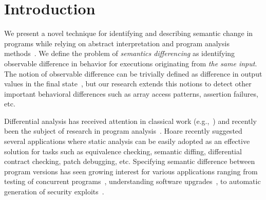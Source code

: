 \section{Introduction} 

We present a novel technique for identifying and describing semantic change in programs while relying on abstract interpretation and program analysis methods~\cite{CousotCousot77}. We define the problem of \emph{semantics differencing} as identifying observable difference in behavior for executions originating from \emph{the same input}. The notion of observable difference can be trivially defined as difference in output values in the final state~\cite{DwyerElbaumPerson08,GodlinStrichman09,EnglerRamos11,HawblitzelKawaguchiLahiriRebelo12}, but our research extends this notions to detect other important behavioral differences such as array access patterns, assertion failures, etc.


Differential analysis has received attention in classical work (e.g.,~\cite{Horwitz90,Horwitz89,JacksonLadd94}) and recently been the subject of research in program analysis~\cite{DwyerElbaumPerson08,GodlinStrichman09,EnglerRamos11,HawblitzelKawaguchiLahiriRebelo12}. Hoare recently suggested~\cite{HoareLahiriVaswani10} several applications where static analysis can be easily adopted as an effective solution for tasks such as equivalence checking, semantic diffing, differential contract checking, patch debugging, etc. Specifying semantic difference between program versions has seen growing interest for various applications ranging from testing of concurrent programs~\cite{ChakiGurfinkelStrichman12}, understanding software upgrades~\cite{JinOrsoXie10}, to automatic generation of security exploits~\cite{BrumleyPoosankamSongZheng08}.

